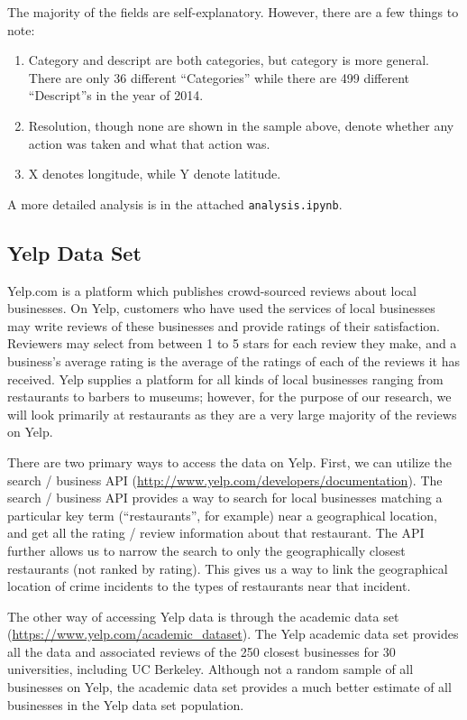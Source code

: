 \documentclass{article}
\begin{document}
The majority of the fields are self-explanatory. However, there are a few
things to note:
\begin{enumerate}
\item Category and descript are both categories, but category is more
  general. There are only 36 different ``Categories'' while there are 499
  different ``Descript''s in the year of 2014.
\item Resolution, though none are shown in the sample above, denote whether
  any action was taken and what that action was.
\item X denotes longitude, while Y denote latitude.
\end{enumerate}

A more detailed analysis is in the attached \texttt{analysis.ipynb}.

\subsection{Yelp Data Set}

Yelp.com is a platform which publishes crowd-sourced reviews about local
businesses. On Yelp, customers who have used the services of local
businesses may write reviews of these businesses and provide ratings of
their satisfaction. Reviewers may select from between 1 to 5 stars for each
review they make, and a business's average rating is the average of the
ratings of each of the reviews it has received. Yelp supplies a platform
for all kinds of local businesses ranging from restaurants to barbers to
museums; however, for the purpose of our research, we will look primarily
at restaurants as they are a very large majority of the reviews on Yelp.

There are two primary ways to access the data on Yelp. First, we can
utilize the search / business API
(\url{http://www.yelp.com/developers/documentation}). The search / business
API provides a way to search for local businesses matching a particular key
term (``restaurants'', for example) near a geographical location, and get
all the rating / review information about that restaurant. The API further
allows us to narrow the search to only the geographically closest
restaurants (not ranked by rating). This gives us a way to link the
geographical location of crime incidents to the types of restaurants near
that incident.

The other way of accessing Yelp data is through the academic data set
(\url{https://www.yelp.com/academic_dataset}). The Yelp academic data set
provides all the data and associated reviews of the 250 closest businesses
for 30 universities, including UC Berkeley. Although not a random sample of
all businesses on Yelp, the academic data set provides a much better
estimate of all businesses in the Yelp data set population.
\end{document}
